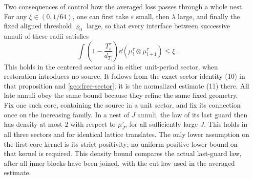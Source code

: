Two consequences of \cite[Proposition~5.3 and Corollary~5.5]{S}
control how the averaged loss passes through a whole nest.
For any \(\xi\in(0,1/64)\), one can first take
\(\varepsilon\) small, then \(\lambda\) large, and finally the fixed
aligned threshold \(\varrho_0\) large, so that every interface between
successive annuli of these radii satisfies
\begin{equation}\label{geo:regular-loss}
 \int\left(1-\frac{T_i^\tau}{d_{T_i}}\right)
             \dd(\mu_i^\tau\otimes\mu_{i+1}^\tau)\le\xi.
\end{equation}
This holds in the centered sector and in either unit-period sector,
when restoration introduces no source.  It follows from the exact
sector identity (10) in that proposition and
\eqref{geo:free-sector}; it is the normalized estimate (11) there.
All late annuli obey the same bound because they refine the same
fixed geometry.  Fix one such core, containing the source in a unit
sector, and fix its connection once on the increasing family.  In a nest
of \(J\) annuli, the law of its last guard then has density at most \(2\)
with respect to
\(\mu_J^\tau\), for all sufficiently large \(J\).  This holds in
all three sectors and for identical lattice translates.  The only
lower assumption on the first core kernel is its strict positivity;
no uniform positive lower bound on that kernel is required.
This density bound compares the actual last-guard law, after all inner
blocks have been joined, with the cut law used in the averaged estimate.

